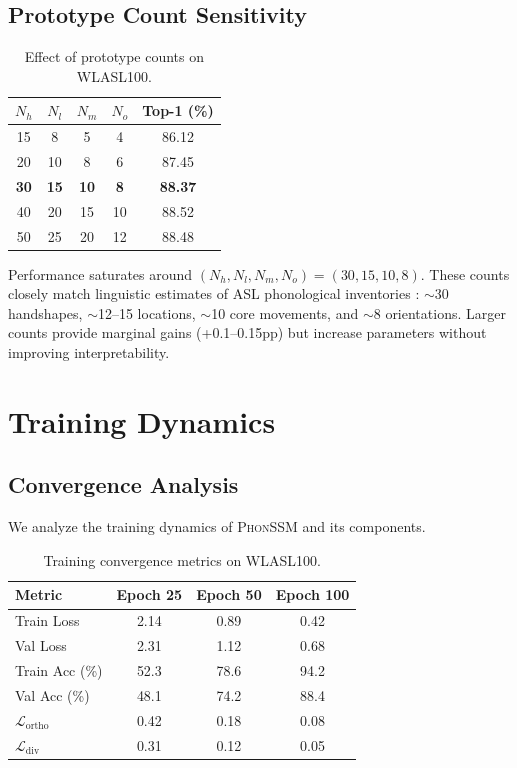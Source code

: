 \documentclass[sigconf,nonacm,anonymous]{acmart}
\theoremstyle{definition}
\theoremstyle{remark}
\newcommand{\phonssm}{\textsc{PhonSSM}}
\begin{document}
\subsection{Prototype Count Sensitivity}

\begin{table}[ht]
\caption{Effect of prototype counts on WLASL100.}
\label{tab:proto_sensitivity}
\begin{center}
\small
\begin{tabular}{ccccc}
\toprule
$N_h$ & $N_l$ & $N_m$ & $N_o$ & Top-1 (\%) \\
\midrule
15 & 8 & 5 & 4 & 86.12 \\
20 & 10 & 8 & 6 & 87.45 \\
\textbf{30} & \textbf{15} & \textbf{10} & \textbf{8} & \textbf{88.37} \\
40 & 20 & 15 & 10 & 88.52 \\
50 & 25 & 20 & 12 & 88.48 \\
\bottomrule
\end{tabular}
\end{center}
\end{table}

Performance saturates around $(N_h, N_l, N_m, N_o) = (30, 15, 10, 8)$. These counts closely match linguistic estimates of ASL phonological inventories \cite{battison1978lexical}: $\sim$30 handshapes, $\sim$12--15 locations, $\sim$10 core movements, and $\sim$8 orientations. Larger counts provide marginal gains (+0.1--0.15pp) but increase parameters without improving interpretability.

\section{Training Dynamics}
\label{app:training}

\subsection{Convergence Analysis}

We analyze the training dynamics of \phonssm{} and its components.

\begin{table}[ht]
\caption{Training convergence metrics on WLASL100.}
\label{tab:convergence}
\begin{center}
\small
\begin{tabular}{lccc}
\toprule
Metric & Epoch 25 & Epoch 50 & Epoch 100 \\
\midrule
Train Loss & 2.14 & 0.89 & 0.42 \\
Val Loss & 2.31 & 1.12 & 0.68 \\
Train Acc (\%) & 52.3 & 78.6 & 94.2 \\
Val Acc (\%) & 48.1 & 74.2 & 88.4 \\
$\mathcal{L}_{\text{ortho}}$ & 0.42 & 0.18 & 0.08 \\
$\mathcal{L}_{\text{div}}$ & 0.31 & 0.12 & 0.05 \\
\bottomrule
\end{tabular}
\end{center}
\end{table}
\end{document}
